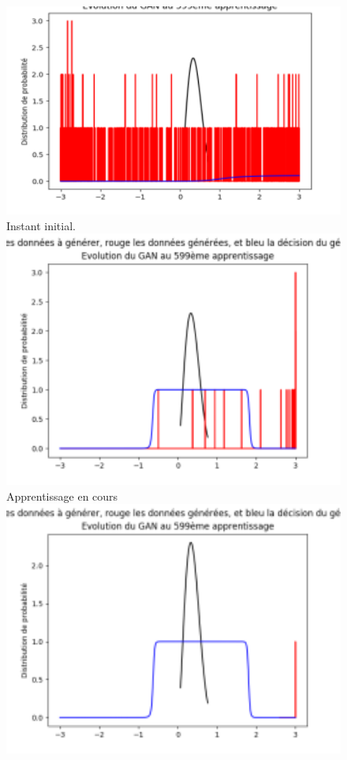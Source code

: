\begin{figure}[h!]
\begin{center}
\includegraphics[width=1\textwidth]{images/Gan1D-1.png}
\centering\\Instant initial.
\endminipage\hfill
{}
\includegraphics[width=1\textwidth]{images/Gan1D-4.png}
\centering\\Apprentissage en cours
\endminipage\hfill
{}
\includegraphics[width=1\textwidth]{images/Gan1D-5.png}

\end{center}
\end{figure}
